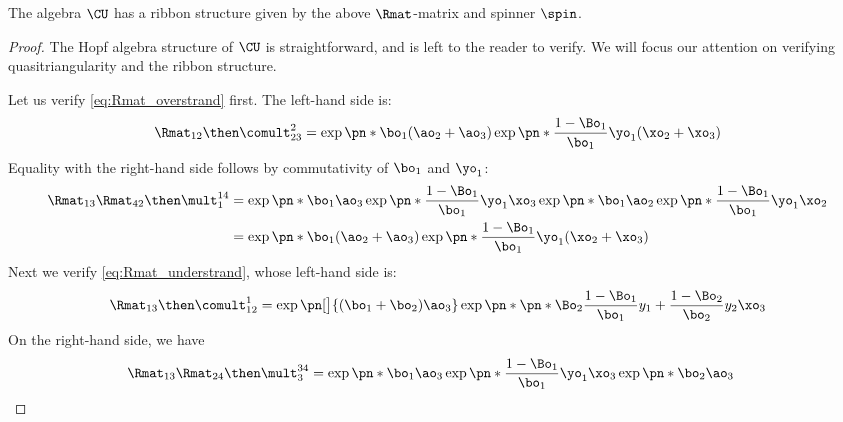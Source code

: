 \begin{lemma}
        The algebra $\CU$ has a ribbon structure given by the above
        $\Rmat$-matrix and spinner $\spin$.
\end{lemma}
\begin{proof}
        The Hopf algebra structure of $\CU$ is straightforward, and is left to
        the reader to verify. We will focus our attention on verifying
        quasitriangularity and the ribbon structure.

        Let us verify \cref{eq:Rmat_overstrand} first. The left-hand side is:
        \begin{equation}
                \Rmat_{12} \then \comult^{2}_{23} =
                \exp\pn*{\bo_1(\ao_2+\ao_3)}
                \exp\pn*{\frac{1-\Bo_1}{\bo_1}\yo_1(\xo_2+\xo_3)}
        \end{equation}
        Equality with the right-hand side follows by commutativity of $\bo_1$
        and $\yo_1$:
        \begin{equation}\begin{aligned}
                \Rmat_{13} \Rmat_{42} \then \mult^{14}_{1}
                &=
                \exp\pn*{\bo_1\ao_3}
                \exp\pn*{\frac{1-\Bo_1}{\bo_1}\yo_1\xo_3}
                \exp\pn*{\bo_1\ao_2}
                \exp\pn*{\frac{1-\Bo_1}{\bo_1}\yo_1\xo_2}
                \\&=
                \exp\pn*{\bo_1(\ao_2+\ao_3)}
                \exp\pn*{\frac{1-\Bo_1}{\bo_1}\yo_1(\xo_2+\xo_3)}
        \end{aligned}\end{equation}
        Next we verify \cref{eq:Rmat_understrand}, whose left-hand side is:
        \begin{equation}
                \Rmat_{13}\then\comult^{1}_{12} =
                \exp\pn[\big]{(\bo_1+\bo_2)\ao_3}
                \exp\pn*{
                        \pn*{
                                \Bo_2\frac{1-\Bo_1}{\bo_1}y_1+
                                \frac{1-\Bo_2}{\bo_2}y_2
                        }
                        \xo_3
                }
        \end{equation}
        On the right-hand side, we have
        \begin{equation}
        \begin{aligned}
                \Rmat_{13}\Rmat_{24}\then\mult^{34}_3
                &=
                \exp\pn*{\bo_1\ao_3}
                \exp\pn*{\frac{1-\Bo_1}{\bo_1}\yo_1\xo_3}
                \exp\pn*{\bo_2\ao_3}

\end{aligned}
\end{equation}
\end{proof}
